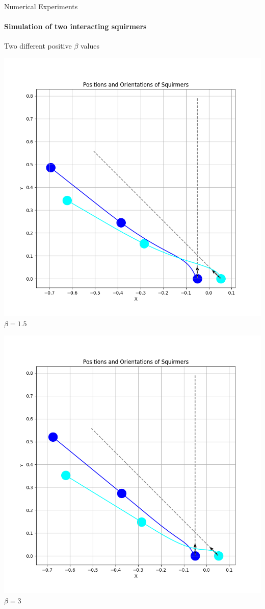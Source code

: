 \documentclass{beamer}
\begin{document}
\begin{frame}{Numerical Experiments}
    \framesubtitle{Simulation of two interacting squirmers}
    \begin{center}
        Two different positive $\beta$ values
    \end{center}
    \begin{minipage}{0.49\textwidth}
        \centering
        \includegraphics[width=1\textwidth]{../../graphs/simulations/sim_sq_sq/beta1_5/3pi_4_.png}
        $\beta = 1.5$
    \end{minipage}
    \begin{minipage}{0.49\textwidth}
        \centering
        \includegraphics[width=1\textwidth]{../../graphs/simulations/sim_sq_sq/beta3/3pi_4_.png}
        $\beta = 3$
    \end{minipage}
\end{frame}
\end{document}
